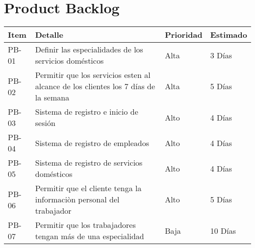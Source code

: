 \chapter{Product Backlog}

\begin{tabular}{ |p{2.25cm}|p{5.5cm}|p{2.25cm}|p{2.25cm}| }
	\hline
	\rowcolor{blue!40}  \textbf{Item}  & \textbf{Detalle}  & \textbf{Prioridad} & \textbf{Estimado}   \\  \hline
	\centering PB-01  &Definir las especialidades de los servicios domésticos & \centering Alta  & 3 Días  \\   \hline
	\centering PB-02 &  Permitir que los servicios esten al alcance de los clientes los
	7 días de la semana   & \centering Alta  &  5 Días \\   \hline
	\centering PB-03 & Sistema de registro e inicio de sesión & \centering Alto & 4 Días  \\
	\hline
	\centering PB-04 & Sistema de registro de empleados & \centering Alto & 4 Días \\
	\hline
	\centering PB-05 & Sistema de registro de servicios
	domésticos & \centering Alto &  4 Días\\
	\hline
	\centering PB-06 & Permitir que el cliente tenga la informaciòn personal del trabajador & \centering Alto &  5 Días\\
	\hline
	\centering PB-07  &  Permitir que los trabajadores tengan más de una especialidad   & \centering Baja & 10 Días \\ \hline
\end{tabular}
